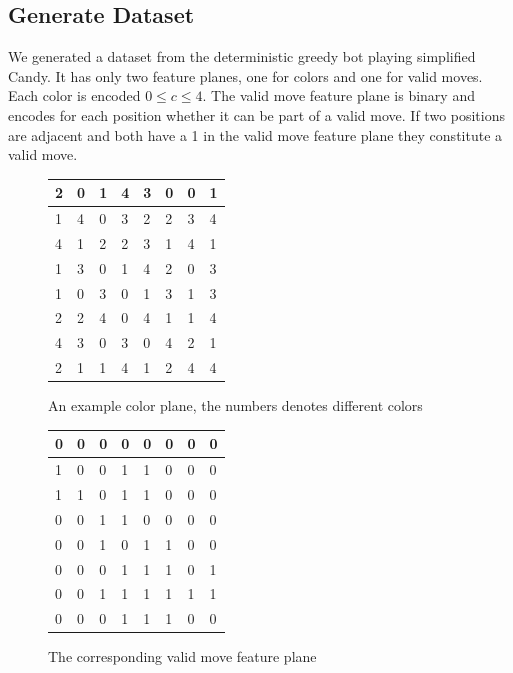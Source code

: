 \documentclass{kththesis}
\begin{document}
\subsection{Generate Dataset}
We generated a dataset from the deterministic greedy bot playing simplified Candy. It has only two feature planes, one for colors and one for valid moves. Each color is encoded $0 \leq c\leq 4$. The valid move feature plane is binary and encodes for each position whether it can be part of  a valid move. If two positions are adjacent and both have a 1 in the valid move feature plane they constitute a valid move.
\\

\begin{figure}[!tbp]
  \centering
  \begin{minipage}[b]{0.4\textwidth}
\begin{tabular}{|l|l|l|l|l|l|l|l|}
\hline
2&0&1&4&3&0&0&1\\
\hline
1&4&0&3&2&2&3&4\\
\hline
4&1&2&2&3&1&4&1\\ 
\hline
1&3&0&1&4&2&0&3\\
\hline
1&0&3&0&1&3&1&3\\ 
\hline
2&2&4&0&4&1&1&4\\
\hline
4&3&0&3&0&4&2&1\\ 
\hline
2&1&1&4&1&2&4&4\\
\hline
\end{tabular}
    \caption{An example color plane, the numbers denotes different colors\\}
  \end{minipage}
  \hfill
  \begin{minipage}[b]{0.4\textwidth}
\begin{tabular}{|l|l|l|l|l|l|l|l|}
\hline
0& 0& 0& 0& 0& 0& 0& 0\\
\hline
1& 0& 0& 1& 1& 0& 0& 0 \\
\hline
1& 1& 0& 1& 1& 0& 0& 0\\
\hline
0& 0& 1& 1& 0& 0& 0& 0 \\
\hline
0& 0& 1& 0& 1& 1& 0& 0 \\
\hline
0& 0& 0& 1& 1& 1& 0& 1 \\
\hline
0& 0& 1& 1& 1& 1& 1& 1 \\
\hline
0& 0& 0& 1& 1& 1& 0& 0 \\
\hline
\end{tabular}
    \caption{The corresponding valid move feature plane}
  \end{minipage}
\end{figure}
\end{document}
